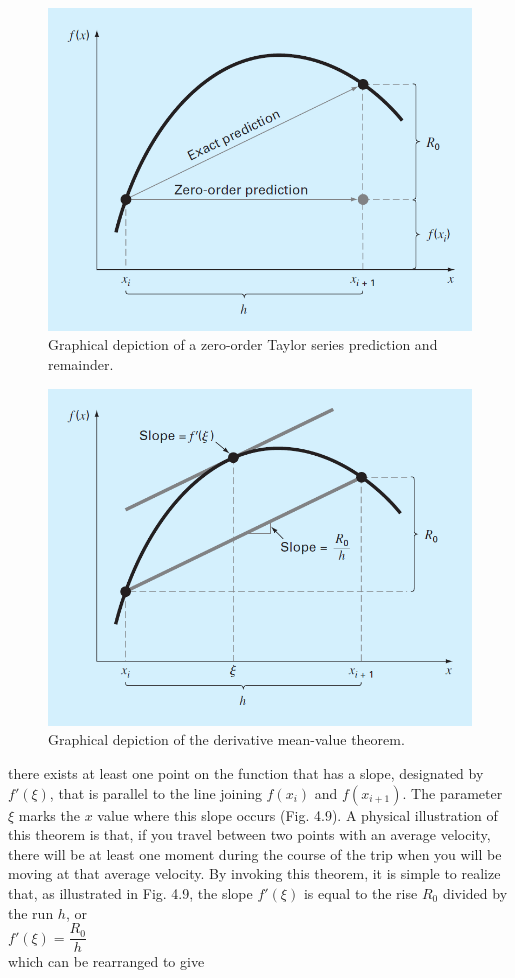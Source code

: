 \documentclass[../main.tex]{subfiles}
\begin{document}
\begin{figure}[h]
    \includegraphics[width=0.55\linewidth]{./images/fig_4_8}
    \caption{Graphical depiction of a zero-order Taylor series prediction and remainder.\hfill}
\end{figure}

\begin{figure}[h]
    \includegraphics[width=0.55\linewidth]{./images/fig_4_9}
    \caption{Graphical depiction of the derivative mean-value theorem.}
\end{figure}

\noindent
there exists at least one point on the function that has a slope, designated by $f'(\xi)$, that is
parallel to the line joining $f(x_i)$ and $f(x_{i+1})$. The parameter $\xi$ marks the $x$ value where this
slope occurs (Fig. 4.9). A physical illustration of this theorem is that, if you travel between
two points with an average velocity, there will be at least one moment during the course of
the trip when you will be moving at that average velocity.
By invoking this theorem, it is simple to realize that, as illustrated in Fig. 4.9, the slope
$f'(\xi)$ is equal to the rise $R_0$ divided by the run $h$, or\\

$f'(\xi)=\dfrac{R_0}{h}$\\

\noindent
which can be rearranged to give\\
\end{document}
